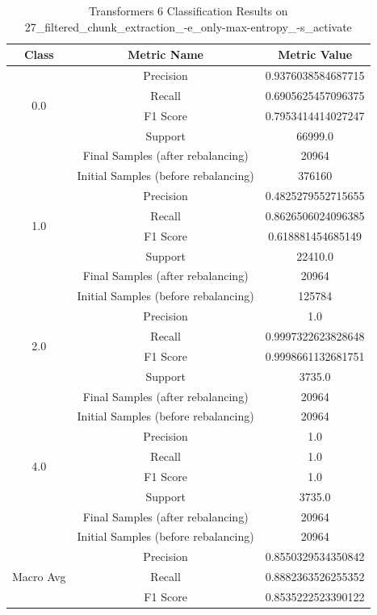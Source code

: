 \begin{longtable}{|c|c|c|}
\caption{Transformers 6 Classification Results on 27\_filtered\_chunk\_extraction\_-e\_only-max-entropy\_-s\_activate} \label{tab:27_filtered_chunk_extraction_-e_only-max-entropy_-s_activate_transformers_6_classifiers_results} \\
\hline
Class & Metric Name & Metric Value \\
\hline
\multirow{4}{*}{0.0} & Precision & 0.9376038584687715 \\
 & Recall & 0.6905625457096375 \\
 & F1 Score & 0.7953414414027247 \\
 & Support & 66999.0 \\
 & Final Samples (after rebalancing) & 20964 \\
 & Initial Samples (before rebalancing) & 376160 \\
\hline
\multirow{4}{*}{1.0} & Precision & 0.4825279552715655 \\
 & Recall & 0.8626506024096385 \\
 & F1 Score & 0.618881454685149 \\
 & Support & 22410.0 \\
 & Final Samples (after rebalancing) & 20964 \\
 & Initial Samples (before rebalancing) & 125784 \\
\hline
\multirow{4}{*}{2.0} & Precision & 1.0 \\
 & Recall & 0.9997322623828648 \\
 & F1 Score & 0.9998661132681751 \\
 & Support & 3735.0 \\
 & Final Samples (after rebalancing) & 20964 \\
 & Initial Samples (before rebalancing) & 20964 \\
\hline
\multirow{4}{*}{4.0} & Precision & 1.0 \\
 & Recall & 1.0 \\
 & F1 Score & 1.0 \\
 & Support & 3735.0 \\
 & Final Samples (after rebalancing) & 20964 \\
 & Initial Samples (before rebalancing) & 20964 \\
\hline
\multirow{4}{*}{Macro Avg} & Precision & 0.8550329534350842 \\
 & Recall & 0.8882363526255352 \\
 & F1 Score & 0.8535222523390122 \\

\end{longtable}
